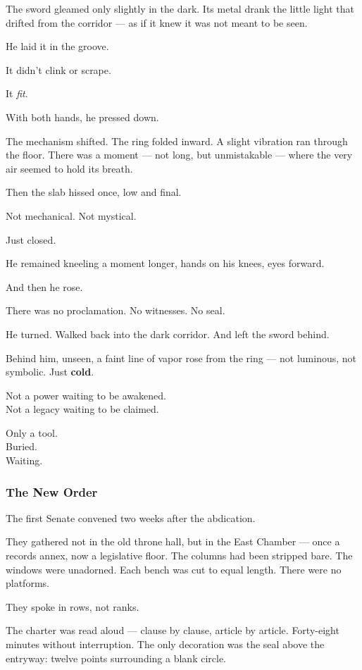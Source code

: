 \documentclass[12pt]{article}
\begin{document}
The sword gleamed only slightly in the dark. Its metal drank the little light that drifted from the corridor --- as if it knew it was not meant to be seen.

He laid it in the groove.

It didn’t clink or scrape.

It \textit{fit}.

With both hands, he pressed down.

The mechanism shifted. The ring folded inward. A slight vibration ran through the floor. There was a moment --- not long, but unmistakable --- where the very air seemed to hold its breath.

Then the slab hissed once, low and final.

Not mechanical. Not mystical.

Just closed.

He remained kneeling a moment longer, hands on his knees, eyes forward.

And then he rose.

There was no proclamation. No witnesses. No seal.

He turned. Walked back into the dark corridor. And left the sword behind.

\vspace{1em}

Behind him, unseen, a faint line of vapor rose from the ring --- not luminous, not symbolic. Just \textbf{cold}.

Not a power waiting to be awakened.\\
Not a legacy waiting to be claimed.

Only a tool.\\
Buried.\\
Waiting.

\dotfill

\subsubsection{The New Order}

The first Senate convened two weeks after the abdication.

They gathered not in the old throne hall, but in the East Chamber --- once a records annex, now a legislative floor. The columns had been stripped bare. The windows were unadorned. Each bench was cut to equal length. There were no platforms.

They spoke in rows, not ranks.

The charter was read aloud --- clause by clause, article by article. Forty-eight minutes without interruption. The only decoration was the seal above the entryway: twelve points surrounding a blank circle.
\end{document}
